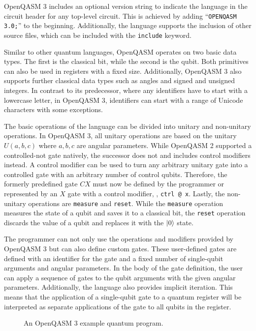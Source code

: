 OpenQASM 3 includes an optional version string to indicate the language in the circuit header for any top-level circuit. This is achieved by adding ``\texttt{OPENQASM 3.0;}'' to the beginning. Additionally, the language supports the inclusion of other source files, which can be included with the \texttt{include} keyword.

Similar to other quantum languages, OpenQASM operates on two basic data types. The first is the classical bit, while the second is the qubit. Both primitives can also be used in registers with a fixed size. Additionally, OpenQASM 3 also supports further classical data types such as angles and signed and unsigned integers.
In contrast to its predecessor, where any identifiers have to start with a lowercase letter, in OpenQASM 3, identifiers can start with a range of Unicode characters with some exceptions. 

The basic operations of the language can be divided into unitary and non-unitary operations. In OpenQASM 3, all unitary operations are based on the unitary $U(a,b,c)$ where $a,b,c$ are angular parameters.
While OpenQASM 2 supported a controlled-not gate natively, the successor does not and includes control modifiers instead. A control modifier can be used to turn any arbitrary unitary gate into a controlled gate with an arbitrary number of control qubits. Therefore, the formerly predefined gate $CX$ must now be defined by the programmer or represented by an $X$ gate with a control modifier, \eg, \texttt{ctrl @ x}. Lastly, the non-unitary operations are \texttt{measure} and \texttt{reset}. While the \texttt{measure} operation measures the state of a qubit and saves it to a classical bit, the \texttt{reset} operation discards the value of a qubit and replaces it with the $\ket{0}$ state.

The programmer can not only use the operations and modifiers provided by OpenQASM 3 but can also define custom gates. These user-defined gates are defined with an identifier for the gate and a fixed number of single-qubit arguments and angular parameters. In the body of the gate definition, the user can apply a sequence of gates to the qubit arguments with the given angular parameters. Additionally, the language also provides implicit iteration. This means that the application of a single-qubit gate to a quantum register will be interpreted as separate applications of the gate to all qubits in the register.

\begin{figure}[htp]
    \centering     
    
    \caption{An OpenQASM 3 example quantum program.}
    \label{fig:qasm_example}
\end{figure}

